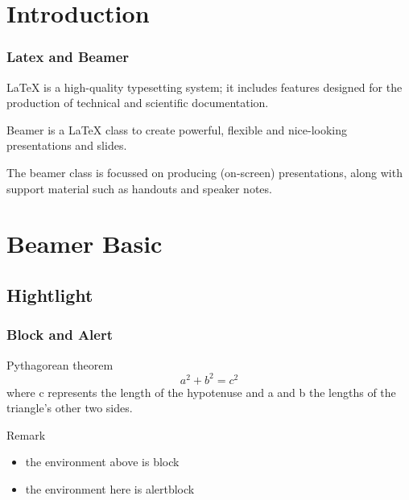 \frame{\titlepage}

\section{Introduction}

\begin{frame}
    \frametitle{Latex and Beamer}
    
    LaTeX is a high-quality typesetting system; 
    it includes features designed for the production of 
    technical and scientific documentation.

    \vspace{0.4cm}

    \pause

    Beamer is a LaTeX class to create powerful, 
    flexible and nice-looking presentations and slides. 
    
    The beamer class is focussed on producing (on-screen) presentations, 
    along with support material such as handouts and speaker notes.
    
\end{frame}

\section{Beamer Basic}
\subsection{Hightlight}

\begin{frame}
    \frametitle{Block and Alert}

    \begin{block}{Pythagorean theorem}
        \vspace*{-\baselineskip}\setlength\belowdisplayshortskip{0.6pt}
        $$a^2 + b^2 = c^2$$
        where c represents the length of the hypotenuse and 
        a and b the lengths of the triangle's other two sides.
    \end{block}
    
    \begin{alertblock}{Remark}
        \begin{itemize}
            \item the environment above is \alert{block}
            \item the environment here is \alert{alertblock}
        \end{itemize}
    \end{alertblock}

\end{frame}

